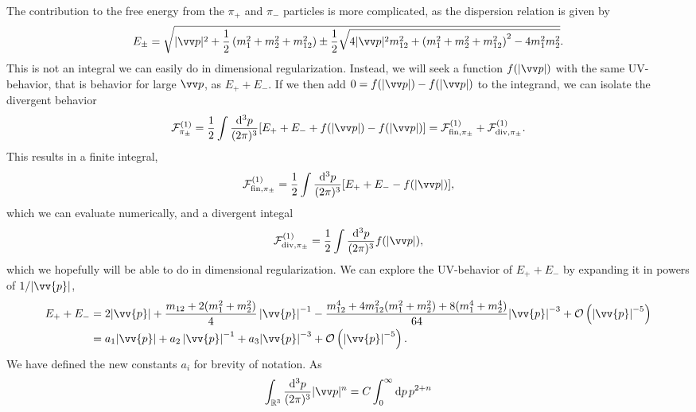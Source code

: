 The contribution to the free energy from the $\pi_+$ and $\pi_-$ particles is more complicated, as the dispersion relation is given by
\begin{equation}
    E_\pm
    = 
    \sqrt{
        |\vv p|^2 +
        \frac{1}{2}
        \left(
            m_1^2 + m_2^2 + m_{12}^2 
        \right)
        \pm 
        \frac{1}{2}
        \sqrt{
            4|\vv p|^2m_{12}^2 
            +
            \left(
                m_1^2 + m_2^2 + m_{12}^2
            \right)^2
            - 4 m_1^2 m_2^2
        }
    }.
\end{equation}
This is not an integral we can easily do in dimensional regularization.
Instead, we will seek a function $f(|\vv p|)$ with the same UV-behavior, that is behavior for large $\vv p$, as $E_+ + E_-$.
If we then add $0 = f(|\vv p|) - f(|\vv p|)$ to the integrand, we can isolate the divergent behavior
\begin{equation}
    \Ef_{\pi_\pm}^{(1)}
    = 
    \frac{1}{2} \int \frac{\dd^3 p}{(2\pi)^3} [E_+ + E_- + f(|\vv p|) - f(|\vv p|)]
    = \Ef^{(1)}_{\mathrm{fin}, \pi_\pm } + \Ef^{(1)}_{\mathrm{div}, \pi_\pm}.
\end{equation}
This results in a finite integral, 
\begin{equation}
    \Ef^{(1)}_{\mathrm{fin}, \pi_\pm } = \frac{1}{2} \int \frac{\dd^3 p}{(2\pi)^3} [E_+ + E_- - f(|\vv p|)],
\end{equation}
which we can evaluate numerically, and a divergent integal
\begin{equation}
    \Ef^{(1)}_{\mathrm{div}, \pi_\pm }
    = 
    \frac{1}{2} \int \frac{\dd^3 p}{(2\pi)^3} f(|\vv p|),
\end{equation}
which we hopefully will be able to do in dimensional regularization.
We can explore the UV-behavior of $E_+ + E_-$ by expanding it in powers of $1 / \abs{\vv{p}}$,
\begin{align}
    \nonumber
    E_+ + E_-
    & = 
    2  \abs{\vv{p}}
    + \frac{m_{12} + 2(m_1^2 + m_2^2)}{4} \, {\abs{\vv{p}}}^{-1}
    - \frac{m_{12}^4 + 4 m_{12}^2(m_1^2 + m_2^2) + 8(m_1^4 + m_2^4)}{64}
    {\abs{\vv{p}}}^{-3}
    + \Oh[-5]{ \abs{\vv{p}}} 
    \\
    & = 
    a_1  \abs{\vv{p}}
    + a_2 \, {\abs{\vv{p}}}^{-1}
    + a_3
    {\abs{\vv{p}}}^{-3}
    + \Oh[-5]{ \abs{\vv{p}}}.
\end{align}
We have defined the new constants $a_i$ for brevity of notation.
As
\begin{equation}
    \int_{\R^3} \frac{\dd^3 p}{(2 \pi)^3} |\vv p|^{n}
    = C \int_{0}^\infty \dd p \, p^{2 + n}
\end{equation}
